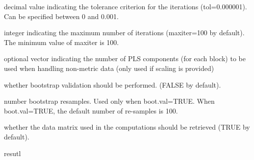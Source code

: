 \documentclass[a4paper]{book}
\begin{document}
\begin{Arguments}
\begin{ldescription}
\item[\code{tol}] decimal value indicating the tolerance criterion
for the iterations (tol=0.000001). Can be specified between 0 and 0.001.

\item[\code{maxiter}] integer indicating the maximum number of iterations
(maxiter=100 by default). The minimum value of maxiter is 100.

\item[\code{plscomp}] optional vector indicating the number of PLS components
(for each block) to be used when handling non-metric data
(only used if scaling is provided)

\item[\code{boot.val}] whether bootstrap validation should be performed.
(FALSE by default).

\item[\code{br}] number bootstrap resamples. Used only when boot.val=TRUE. When boot.val=TRUE, the default number of re-samples is 100.

\item[\code{dataset}] whether the data matrix used in the computations should be retrieved (TRUE by default).
\end{ldescription}
\end{Arguments}
%
\begin{Value}
resutl
\end{Value}
%
\end{document}
